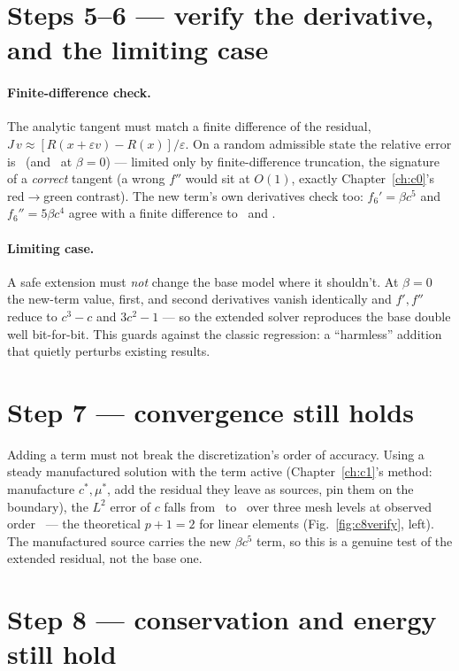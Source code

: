 \section{Steps 5--6 --- verify the derivative, and the limiting case}

\paragraph{Finite-difference check.} The analytic tangent must match a finite
difference of the residual, $J\,v\approx[R(x+\varepsilon v)-R(x)]/\varepsilon$.
On a random admissible state the relative error is \CeightJacFd\ (and
\CeightJacFdBase\ at $\beta=0$) --- limited only by finite-difference
truncation, the signature of a \emph{correct} tangent (a wrong $f''$ would sit
at $O(1)$, exactly Chapter~\ref{ch:c0}'s red$\to$green contrast). The new term's
own derivatives check too: $f_6'=\beta c^5$ and $f_6''=5\beta c^4$ agree with a
finite difference to \CeightTermFp\ and \CeightTermFpp.

\paragraph{Limiting case.} A safe extension must \emph{not} change the base
model where it shouldn't. At $\beta=0$ the new-term value, first, and second
derivatives vanish identically and $f',f''$ reduce to $c^3-c$ and $3c^2-1$ --- so
the extended solver reproduces the base double well bit-for-bit. This guards
against the classic regression: a ``harmless'' addition that quietly perturbs
existing results.

\section{Step 7 --- convergence still holds}

Adding a term must not break the discretization's order of accuracy. Using a
steady manufactured solution with the term active (Chapter~\ref{ch:c1}'s method:
manufacture $c^\ast,\mu^\ast$, add the residual they leave as sources, pin them
on the boundary), the $L^2$ error of $c$ falls from \CeightMmsCoarse\ to
\CeightMmsFine\ over three mesh levels at observed order \CeightMmsOrder\ ---
the theoretical $p{+}1=2$ for linear elements (Fig.~\ref{fig:c8verify}, left).
The manufactured source carries the new $\beta c^5$ term, so this is a genuine
test of the extended residual, not the base one.

\section{Step 8 --- conservation and energy still hold}

